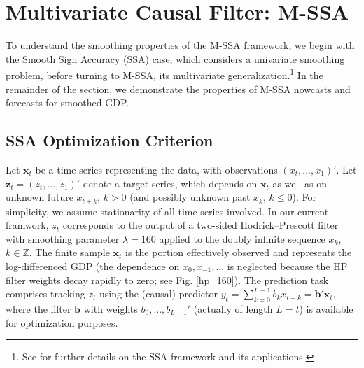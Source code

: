 \documentclass[11pt,a4paper]{article}
\begin{document}
\section{Multivariate Causal Filter: M-SSA}\label{sec:mSSA}

To understand the smoothing properties of the M-SSA framework, we begin with the Smooth Sign Accuracy (SSA) case, which considers a univariate smoothing problem, before turning to M-SSA, its multivariate generalization.\footnote{See \cite{Wildi2024} for further details on the SSA framework and its applications.} In the remainder of the section, we demonstrate the properties of M-SSA nowcasts and forecasts for smoothed GDP.

\subsection{SSA Optimization Criterion}

Let $\mathbf{x}_t$ be a time series representing the data, with observations $(x_{t},...,x_{1})'$. Let $\mathbf{z}_t=(z_{t},...,z_1)'$  denote a target series, which depends on $\mathbf{x}_t$ as well as on unknown future $x_{t+k}$, $k>0$ (and possibly unknown past $x_k$, $k\leq 0$). For simplicity, we assume stationarity of all time series involved. In our current framwork, $z_t$ corresponds to the output of a two-sided Hodrick–Prescott filter with smoothing parameter $\lambda = 160$ applied to the doubly infinite sequence $x_k$, $k\in\mathbb{Z}$. The finite sample $\mathbf{x}_t$ is the portion effectively observed and represents the log-differenced GDP (the dependence on $x_0, x_{-1},...$ is neglected because the HP filter weights decay rapidly to zero; see Fig. \eqref{hp_160}). The prediction task comprises tracking $z_{t}$  using the (causal) predictor $y_{t}=\sum_{k=0}^{L-1} b_{k}x_{t-k}=\mathbf{b}'\mathbf{x}_t$, where the filter $\mathbf{b}$ with weights $b_0,...,b_{L-1}'$ (actually of length $L=t$) is available for optimization purposes.
\end{document}

